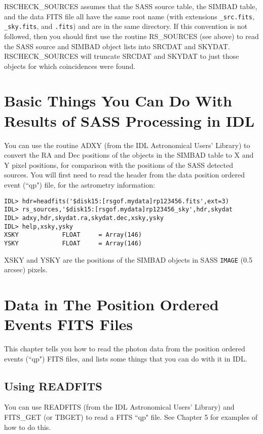 RSCHECK{\_}SOURCES assumes that the SASS source table, the SIMBAD table, and the
data FITS file all have the same root name (with extensions {\tt {\_}src.fits},
{\tt {\_}sky.fits}, and {\tt .fits}) and are in the same directory. If this convention is
not followed, then you should first use the routine RS{\_}SOURCES (see above) to
read the SASS source and SIMBAD object lists into SRCDAT and SKYDAT.
RSCHECK{\_}SOURCES will truncate SRCDAT and SKYDAT to just those objects for which
coincidences were found.
 
\chapter{Basic Things You Can Do With Results of SASS Processing in IDL }
 
You can use the routine ADXY (from the IDL Astronomical Users' Library) to
convert the RA and Dec positions of the objects in the SIMBAD table to X and Y
pixel positions, for comparison with the positions of the SASS detected
sources. You will first need to read the header from the data position ordered
event (``qp") file, for the astrometry information:

\medskip\noindent
\begin{verbatim}
IDL> hdr=headfits('$disk15:[rsgof.mydata]rp123456.fits',ext=3)
IDL> rs_sources,'$disk15:[rsgof.mydata]rp123456_sky',hdr,skydat
IDL> adxy,hdr,skydat.ra,skydat.dec,xsky,ysky
IDL> help,xsky,ysky
XSKY            FLOAT     = Array(146)
YSKY            FLOAT     = Array(146)
\end{verbatim}
XSKY and YSKY are the positions of the SIMBAD objects in SASS {\tt IMAGE}  (0.5
arcsec) pixels.
 
\chapter{Data in The Position Ordered Events FITS Files }
 
This chapter tells you how to read the photon data from the position ordered
events (``qp") FITS files, and lists some things that you can do with it in IDL.
 

\section{Using READFITS}
 
You can use READFITS (from the IDL Astronomical Users' Library) and FITS{\_}GET
(or TBGET) to read a FITS ``qp" file.  See Chapter 5 for examples of how to do
this.
 
